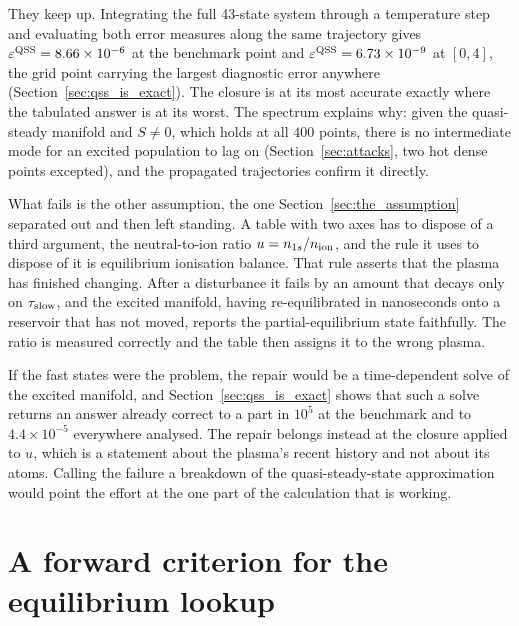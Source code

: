 They keep up. Integrating the full 43-state system through a temperature step
and evaluating both error measures along the same trajectory gives
$\varepsilon^{\mathrm{QSS}} = 8.66\times10^{-6}$ at the benchmark point and
$\varepsilon^{\mathrm{QSS}} = 6.73\times10^{-9}$ at $[0,4]$, the grid point carrying the largest
diagnostic error anywhere (Section~\ref{sec:qss_is_exact}). The closure is at
its most accurate exactly where the tabulated answer is at its worst. The
spectrum explains why: given the quasi-steady manifold and $S \neq 0$, which
holds at all $400$ points, there is no intermediate mode for an excited
population to lag on (Section~\ref{sec:attacks}, two hot dense points
excepted), and the propagated trajectories confirm it directly.

What fails is the other assumption, the one Section~\ref{sec:the_assumption}
separated out and then left standing. A table with two axes has to dispose of a
third argument, the neutral-to-ion ratio $u = n_{1s}/n_{\mathrm{ion}}$, and the rule it uses
to dispose of it is equilibrium ionisation balance. That rule asserts that the
plasma has finished changing. After a disturbance it fails by an amount that
decays only on $\tau_{\mathrm{slow}}$, and the excited manifold, having re-equilibrated in nanoseconds onto a
reservoir that has not moved, reports the partial-equilibrium state faithfully.
The ratio is measured correctly and the table then assigns it to the wrong
plasma.

If the fast states were the problem, the repair would be a time-dependent solve
of the excited manifold, and Section~\ref{sec:qss_is_exact} shows that such a
solve returns an answer already correct to a part in $10^{5}$ at the benchmark
and to $4.4\times10^{-5}$ everywhere analysed. The repair
belongs instead at the closure applied to $u$, which is a statement about the
plasma's recent history and not about its atoms. Calling the failure a
breakdown of the quasi-steady-state approximation would point the effort at the
one part of the calculation that is working.

\section{A forward criterion for the equilibrium lookup}
\label{sec:criterion}

